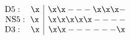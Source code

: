 \begin{equation}
\label{hw1}
 \begin{array}{c|c}
{\rm D5}:\ \ \          \x & \x    \x   -   -   -  \x  \x   \x   - \\
{\rm NS5}:\          \x & \x   \x  \x  \x  \x  -  -   -   -    \\
{\rm D3}: \ \ \       \x & \x \x - - - - - - \x  
                         \end{array} 
\end{equation}

